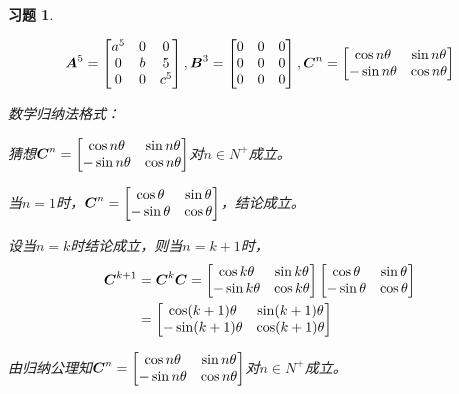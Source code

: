 \documentclass{ctexart}
\newtheorem{problem}{习题}[section]
\begin{document}
\begin{problem}\

\begin{equation*}
    \boldsymbol{A}^5=\begin{bmatrix}a^5&0&0\\0&b&5\\0&0&c^5\end{bmatrix},\boldsymbol{B}^3=\begin{bmatrix}0&0&0\\0&0&0\\0&0&0\end{bmatrix},\boldsymbol{C}^n=\begin{bmatrix}\cos n\theta&\sin n\theta\\-\sin n\theta&\cos n\theta\end{bmatrix}
\end{equation*}

数学归纳法格式：

猜想\(\boldsymbol{C}^n=\begin{bmatrix}\cos n\theta&\sin n\theta\\-\sin n\theta&\cos n\theta\end{bmatrix}\)对\(n\in N^+\)成立。

当\(n=1\)时，\(\boldsymbol{C}^n=\begin{bmatrix}\cos \theta&\sin \theta\\-\sin \theta&\cos \theta\end{bmatrix}\)，结论成立。

设当\(n=k\)时结论成立，则当\(n=k+1\)时，
\begin{align*}
    \boldsymbol{C}^{k+1} & =\boldsymbol{C}^k\boldsymbol{C}=\begin{bmatrix}\cos k\theta&\sin k\theta\\-\sin k\theta&\cos k\theta\end{bmatrix}\begin{bmatrix}\cos \theta&\sin \theta\\-\sin \theta&\cos \theta\end{bmatrix} \\
                & =\begin{bmatrix}\cos (k+1)\theta&\sin (k+1)\theta\\-\sin (k+1)\theta&\cos (k+1)\theta\end{bmatrix}
\end{align*}

由归纳公理知\(\boldsymbol{C}^n=\begin{bmatrix}\cos n\theta&\sin n\theta\\-\sin n\theta&\cos n\theta\end{bmatrix}\)对\(n\in N^+\)成立。

\end{problem}
\end{document}
